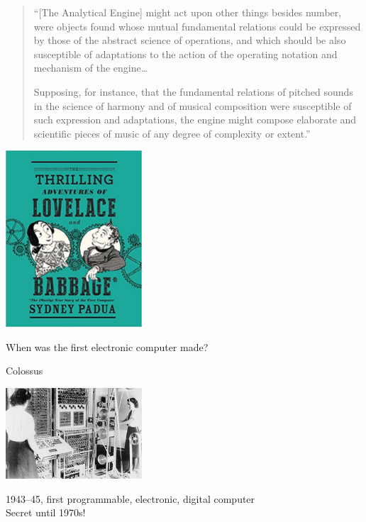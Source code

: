 \documentclass[xcolor={usenames,dvipsnames,svgnames,table},12pt]{beamer}
\begin{document}
\begin{frame}{}
  \begin{quote}
    ``[The Analytical Engine] might act upon other things besides number,
    were objects found whose mutual fundamental relations could be
    expressed by those of the abstract science of operations, and which
    should be also susceptible of adaptations to the action of the
    operating notation and mechanism of the engine\dots \medskip

    Supposing, for instance, that the fundamental relations of pitched
    sounds in the science of harmony and of musical composition were
    susceptible of such expression and adaptations, the engine might
    compose elaborate and scientific pieces of music of any degree of
    complexity or extent.''
  \end{quote}
\end{frame}

\begin{frame}{}
  \begin{center}
    \includegraphics[width=2in]{adventures}
  \end{center}
\end{frame}

\begin{frame}{}
  \begin{center}
    When was the first electronic computer made?
  \end{center}
\end{frame}

\begin{frame}{Colossus}
  \begin{center}
    \includegraphics[width=2in]{Colossus}

    1943--45, first programmable, electronic, digital computer \\
    Secret until 1970s!
  \end{center}
\end{frame}
\end{document}
